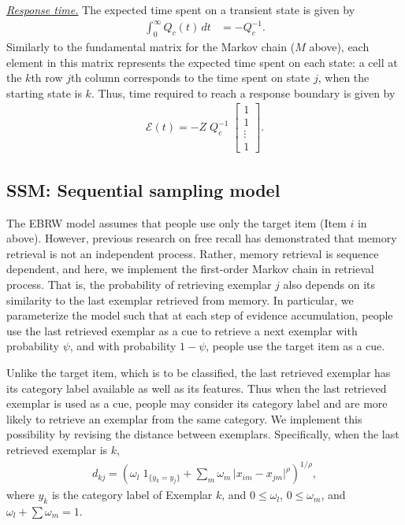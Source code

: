 \documentclass[doc]{apa6}
\newcommand{\subsubsubsection}[1]{\textit{\underline{#1}}}
\begin{document}
\subsubsubsection{Response time.} The expected time spent on a transient state is given by
\begin{align}
    \int_{0}^{\infty} Q_{c}(t) \, dt &= - Q_{c}^{-1}.
\end{align}
Similarly to the fundamental matrix for the Markov chain ($M$ above), each element in this matrix
represents the expected time spent on each state: a cell at the $k$th row $j$th column corresponds
to the time spent on state $j$, when the starting state is $k$. Thus, time required to reach a
response boundary is given by
\begin{align}
    \mathcal{E}(t) = - Z \; Q_{c}^{-1} \; \left[ \begin{array}{c} 1\\1\\\vdots\\1 \end{array} \right].
\end{align}


\subsection{SSM\@: Sequential sampling model}

The EBRW model assumes that people use only the target item (Item $i$ in above). However, previous
research on free recall has demonstrated that memory retrieval is not an independent process.
Rather, memory retrieval is sequence dependent, and here, we implement the first-order Markov chain
in retrieval process. That is, the probability of retrieving exemplar $j$ also depends on its
similarity to the last exemplar retrieved from memory. In particular, we parameterize the model such
that at each step of evidence accumulation, people use the last retrieved exemplar as a cue to
retrieve a next exemplar with probability $\psi$, and with probability $1 - \psi$, people use the
target item as a cue.

Unlike the target item, which is to be classified, the last retrieved exemplar has its category
label available as well as its features. Thus when the last retrieved exemplar is used as a cue,
people may consider its category label and are more likely to retrieve an exemplar from the same
category. We implement this possibility by revising the distance between exemplars. Specifically,
when the last retrieved exemplar is $k$,
\begin{align}
    d_{kj} = {\left( \omega_{l} \; 1_{\{y_k = y_j\}} + \sum_{m} \omega_{m} \, {\vert x_{im} - x_{jm}
    \vert} ^{\rho} \right)}^{1/\rho},
\end{align}
where $y_k$ is the category label of Exemplar $k$, and $0 \leq \omega_{l}$, $0 \leq \omega_{m}$,
and $\omega_{l} + \sum \omega_{m} = 1$.
\end{document}
